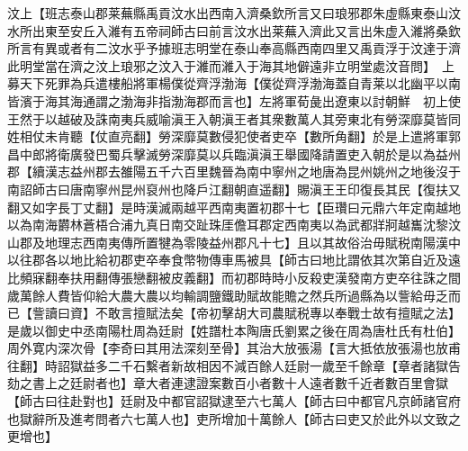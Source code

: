 汶上【班志泰山郡莱蕪縣禹貢汶水出西南入濟桑欽所言又曰琅邪郡朱虛縣東泰山汶水所出東至安丘入濰有五帝祠師古曰前言汶水出莱蕪入濟此又言出朱虚入濰將桑欽所言有異或者有二汶水乎予據班志明堂在泰山奉高縣西南四里又禹貢浮于汶達于濟此明堂當在濟之汶上琅邪之汶入于濰而濰入于海其地僻遠非立明堂處汶音問】　上募天下死罪為兵遣樓船將軍楊僕從齊浮渤海【僕從齊浮渤海蓋自青莱以北幽平以南皆濱于海其海通謂之渤海非指渤海郡而言也】左將軍荀彘出遼東以討朝鮮　初上使王然于以越破及誅南夷兵威喻滇王入朝滇王者其衆數萬人其旁東北有勞深靡莫皆同姓相仗未肯聽【仗直亮翻】勞深靡莫數侵犯使者吏卒【數所角翻】於是上遣將軍郭昌中郎將衛廣發巴蜀兵擊滅勞深靡莫以兵臨滇滇王舉國降請置吏入朝於是以為益州郡【續漢志益州郡去雒陽五千六百里魏晉為南中寧州之地唐為昆州姚州之地後沒于南詔師古曰唐南寧州昆州裒州也降戶江翻朝直遥翻】賜滇王王印復長其民【復扶又翻又如字長丁丈翻】是時漢滅兩越平西南夷置初郡十七【臣瓚曰元鼎六年定南越地以為南海欝林蒼梧合浦九真日南交趾珠厓儋耳郡定西南夷以為武都牂牁越巂沈黎汶山郡及地理志西南夷傳所置犍為零陵益州郡凡十七】且以其故俗治毋賦税南陽漢中以往郡各以地比給初郡吏卒奉食幣物傳車馬被具【師古曰地比謂依其次第自近及遠比頻寐翻奉扶用翻傳張戀翻被皮義翻】而初郡時時小反殺吏漢發南方吏卒往誅之間歲萬餘人費皆仰給大農大農以均輸調鹽鐵助賦故能贍之然兵所過縣為以訾給毋乏而已【訾讀曰資】不敢言擅賦法矣【帝初擊胡大司農賦税專以奉戰士故有擅賦之法】　是歲以御史中丞南陽杜周為廷尉【姓譜杜本陶唐氏劉累之後在周為唐杜氏有杜伯】周外寛内深次骨【李奇曰其用法深刻至骨】其治大放張湯【言大抵依放張湯也放甫往翻】時詔獄益多二千石繫者新故相因不減百餘人廷尉一歲至千餘章【章者諸獄告劾之書上之廷尉者也】章大者連逮證案數百小者數十人遠者數千近者數百里會獄【師古曰往赴對也】廷尉及中都官詔獄逮至六七萬人【師古曰中都官凡京師諸官府也獄辭所及進考問者六七萬人也】吏所增加十萬餘人【師古曰吏又於此外以文致之更增也】

